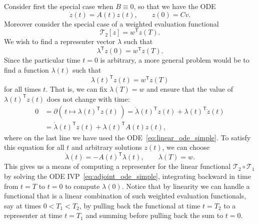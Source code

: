 \documentclass{article}
\begin{document}
Consider first the special case when $B \equiv 0$, so that we have the ODE
\begin{equation}
    \dot z(t) = A(t) z(t), \qquad z(0) = C v.
    \label{eq:linear_ode_simple}
\end{equation}
Moreover consider the special case of a weighted evaluation functional
\begin{equation}
    \mathcal{T}_2[z] = w^\mathsf{T} z(T).
    \label{eq:evaluation_functional}
\end{equation}
We wish to find a representer vector $\lambda$ such that
\begin{equation}
\lambda^\mathsf{T} z(0) = w^\mathsf{T} z(T).
\end{equation}
Since the particular time $t=0$ is arbitrary, a more general problem would be
to find a function $\lambda(t)$ such that
\begin{equation}
    \lambda(t)^\mathsf{T} z(t) = w^\mathsf{T} z(T)
    \label{eq:representer_simple}
\end{equation}
for all times $t$.
That is, we can fix $\lambda(T) = w$ and ensure that the value of
$\lambda(t)^\mathsf{T} z(t)$ does not change with time:
\begin{align}
    0 &= \partial (\, t \mapsto \lambda(t)^\mathsf{T} z(t) \,)
    = \dot \lambda(t)^\mathsf{T} z(t) + \lambda(t)^\mathsf{T} \dot z(t)
    \\
    &= \dot \lambda(t)^\mathsf{T} z(t) + \lambda(t)^\mathsf{T} A(t) z(t),
\end{align}
where on the last line we have used the ODE~\eqref{eq:linear_ode_simple}.
To satisfy this equation for all $t$ and arbitrary solutions $z(t)$, we can
choose
\begin{equation}
    \dot \lambda(t) = - A(t)^\mathsf{T} \lambda(t), \qquad \lambda(T) = w.
    \label{eq:adjoint_ode_simple}
\end{equation}
This gives us a means of computing a representer for the linear functional
$\mathcal{T}_2 \circ \mathcal{T}_1$ by solving the ODE
IVP~\eqref{eq:adjoint_ode_simple}, integrating backward in time from $t=T$ to
$t=0$ to compute $\lambda(0)$.
Notice that by linearity we can handle a functional that is a linear
combination of such weighted evaluation functionals, say at times $0 < T_1 <
T_2$, by pulling back the functional at time $t=T_2$ to a representer at time
$t=T_1$ and summing before pulling back the sum to $t=0$.
\end{document}
